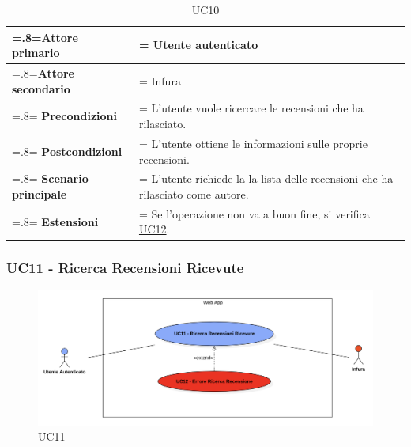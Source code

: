             \begin{table}[H]
                \centering
                \renewcommand{\arraystretch}{1.8}
                \renewcommand\tabularxcolumn[1]{m{#1}}
                \begin{tabularx}{0.9\textwidth} {
                    >{\hsize=.8\hsize\linewidth=\hsize}X
                    >{\hsize=1.2\hsize\linewidth=\hsize}X}
                    \hline
                    \textbf{Attore primario} & Utente autenticato \\
                    \hline
                    \textbf{Attore secondario} & Infura \\
                    \hline
                    \textbf{Precondizioni} & L'utente vuole ricercare le recensioni che ha rilasciato. \\
                    \hline
                    \textbf{Postcondizioni} & L'utente ottiene le informazioni sulle proprie recensioni.\\
                    \hline
                    \textbf{Scenario principale} & L'utente richiede la la lista delle recensioni che ha rilasciato come autore.\\
                    \hline
                    \textbf{Estensioni} & Se l'operazione non va a buon fine, si verifica \hyperref[UC12]{UC12}. \\
                    \hline
                \end{tabularx}
                \caption{UC10}
            \end{table}

        \subsubsection{UC11 - Ricerca Recensioni Ricevute}
        \label{UC11}

            \begin{figure}[H]
                \centering
                \includegraphics[scale=0.6]{src/img/UC11.png}
                \caption{UC11}
            \end{figure}

